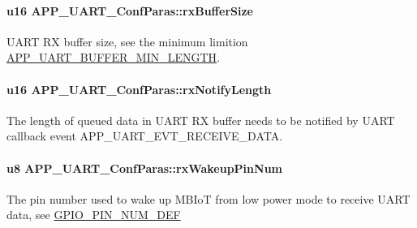 \paragraph[{\texorpdfstring{rx\+Buffer\+Size}{rxBufferSize}}]{\setlength{\rightskip}{0pt plus 5cm}u16 A\+P\+P\+\_\+\+U\+A\+R\+T\+\_\+\+Conf\+Paras\+::rx\+Buffer\+Size}\hypertarget{struct_a_p_p___u_a_r_t___conf_paras_aa600bf0e3bc9cb82642d01d348378c82}{}\label{struct_a_p_p___u_a_r_t___conf_paras_aa600bf0e3bc9cb82642d01d348378c82}
U\+A\+RT RX buffer size, see the minimum limition \hyperlink{group___u_a_r_t___m_i_n_i_m_u_m___b_u_f_f_e_r___l_e_n_ga51ca08a6719a231ab16b26d5f7b1eb1f}{A\+P\+P\+\_\+\+U\+A\+R\+T\+\_\+\+B\+U\+F\+F\+E\+R\+\_\+\+M\+I\+N\+\_\+\+L\+E\+N\+G\+TH}. 
\paragraph[{\texorpdfstring{rx\+Notify\+Length}{rxNotifyLength}}]{\setlength{\rightskip}{0pt plus 5cm}u16 A\+P\+P\+\_\+\+U\+A\+R\+T\+\_\+\+Conf\+Paras\+::rx\+Notify\+Length}\hypertarget{struct_a_p_p___u_a_r_t___conf_paras_a2bbafd648dba36ed57035ab029c31104}{}\label{struct_a_p_p___u_a_r_t___conf_paras_a2bbafd648dba36ed57035ab029c31104}
The length of queued data in U\+A\+RT RX buffer needs to be notified by U\+A\+RT callback event A\+P\+P\+\_\+\+U\+A\+R\+T\+\_\+\+E\+V\+T\+\_\+\+R\+E\+C\+E\+I\+V\+E\+\_\+\+D\+A\+TA. 
\paragraph[{\texorpdfstring{rx\+Wakeup\+Pin\+Num}{rxWakeupPinNum}}]{\setlength{\rightskip}{0pt plus 5cm}u8 A\+P\+P\+\_\+\+U\+A\+R\+T\+\_\+\+Conf\+Paras\+::rx\+Wakeup\+Pin\+Num}\hypertarget{struct_a_p_p___u_a_r_t___conf_paras_a090955f2d6580707c9550c1f5139b41e}{}\label{struct_a_p_p___u_a_r_t___conf_paras_a090955f2d6580707c9550c1f5139b41e}
The pin number used to wake up M\+B\+IoT from low power mode to receive U\+A\+RT data, see \hyperlink{group___g_p_i_o_ga92de7c3421c2bc82f5e88b4303991d1d}{G\+P\+I\+O\+\_\+\+P\+I\+N\+\_\+\+N\+U\+M\+\_\+\+D\+EF} 
